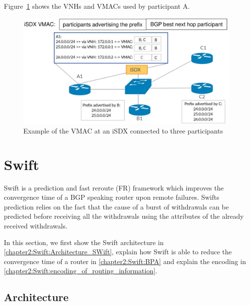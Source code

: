 Figure~\ref{fig:isdx_vmac} shows the VNHs and VMACs used by participant A.

\begin{figure}[h]
\includegraphics[scale = 0.4]{Figures/sdx_vmac2_cropped.pdf}
\caption{Example of the VMAC at an iSDX connected to three participants}
\label{fig:isdx_vmac}
\end{figure}

\newpage

\section{\label{chapter2:Swift}Swift}

Swift is a prediction and fast reroute (FR) framework which improves the convergence time of a BGP speaking router upon remote failures. Swifts prediction relies on the fact that the cause of a burst of withdrawals can be predicted before receiving all the withdrawals using the attributes of the already received withdrawals.

In this section, we first show the Swift architecture in \ref{chapter2:Swift:Architecture_SWift}, explain how Swift is able to reduce the convergence time of a router in \ref{chapter2:Swift:BPA} and explain the encoding in \ref{chapter2:Swift:encoding_of_routing_information}.

\subsection{\label{chapter2:Swift:Architecture_SWift}Architecture}

